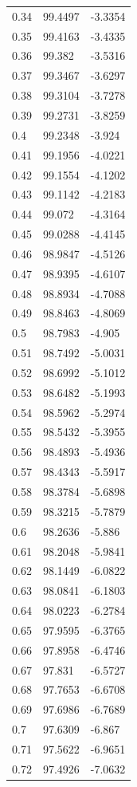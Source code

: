 \begin{table}
\begin{tabular}{lll}
0.34 & 99.4497 & -3.3354 \\
0.35 & 99.4163 & -3.4335 \\
0.36 & 99.382 & -3.5316 \\
0.37 & 99.3467 & -3.6297 \\
0.38 & 99.3104 & -3.7278 \\
0.39 & 99.2731 & -3.8259 \\
0.4 & 99.2348 & -3.924 \\
0.41 & 99.1956 & -4.0221 \\
0.42 & 99.1554 & -4.1202 \\
0.43 & 99.1142 & -4.2183 \\
0.44 & 99.072 & -4.3164 \\
0.45 & 99.0288 & -4.4145 \\
0.46 & 98.9847 & -4.5126 \\
0.47 & 98.9395 & -4.6107 \\
0.48 & 98.8934 & -4.7088 \\
0.49 & 98.8463 & -4.8069 \\
0.5 & 98.7983 & -4.905 \\
0.51 & 98.7492 & -5.0031 \\
0.52 & 98.6992 & -5.1012 \\
0.53 & 98.6482 & -5.1993 \\
0.54 & 98.5962 & -5.2974 \\
0.55 & 98.5432 & -5.3955 \\
0.56 & 98.4893 & -5.4936 \\
0.57 & 98.4343 & -5.5917 \\
0.58 & 98.3784 & -5.6898 \\
0.59 & 98.3215 & -5.7879 \\
0.6 & 98.2636 & -5.886 \\
0.61 & 98.2048 & -5.9841 \\
0.62 & 98.1449 & -6.0822 \\
0.63 & 98.0841 & -6.1803 \\
0.64 & 98.0223 & -6.2784 \\
0.65 & 97.9595 & -6.3765 \\
0.66 & 97.8958 & -6.4746 \\
0.67 & 97.831 & -6.5727 \\
0.68 & 97.7653 & -6.6708 \\
0.69 & 97.6986 & -6.7689 \\
0.7 & 97.6309 & -6.867 \\
0.71 & 97.5622 & -6.9651 \\
0.72 & 97.4926 & -7.0632 \\

\end{tabular}
\end{table}
